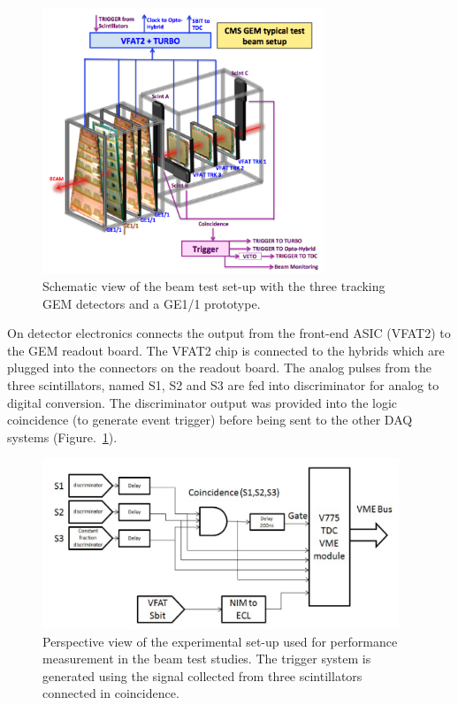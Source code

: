 \begin{figure}[!htbp]
\centering
\includegraphics[width=0.75\textwidth]{figures/GEM/tb_exptsetup_copy.png}
\caption{Schematic view of the beam test set-up with the three tracking GEM detectors and a GE1/1 prototype.}\label{fig:daq}
\end{figure}
On detector electronics connects the output from the front-end ASIC (VFAT2) to the GEM readout board.
The VFAT2 chip is connected to the hybrids which are plugged into the connectors on the readout board.
The analog pulses from the three scintillators, named S1, S2 and S3 are fed into discriminator for analog to digital conversion.
The discriminator output was provided into the logic coincidence (to generate event trigger) before being sent to the other DAQ systems (Figure.~\ref{fig:daq}).
\begin{figure}[!htbp]
\centering
\includegraphics[width=0.95\textwidth]{figures/GEM/daq.png}
\caption{Perspective view of the experimental set-up used for performance measurement in the beam test studies. The trigger system is generated using the signal collected from three scintillators connected in coincidence.}\label{fig:tbs}
\end{figure}
